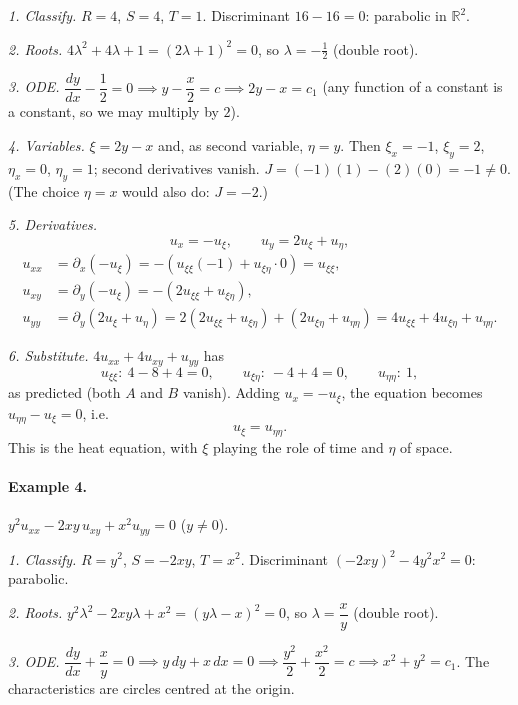 \documentclass[11pt]{article}
\theoremstyle{plain}
\theoremstyle{definition}
\theoremstyle{remark}
\begin{document}
\emph{1. Classify.} $R = 4$, $S = 4$, $T = 1$. Discriminant $16 - 16 = 0$: parabolic in $\mathbb{R}^2$.

\emph{2. Roots.} $4\lambda^2 + 4\lambda + 1 = (2\lambda + 1)^2 = 0$, so $\lambda = -\frac12$ (double root).

\emph{3. ODE.} $\dfrac{dy}{dx} - \dfrac12 = 0 \implies y - \dfrac x2 = c \implies 2y - x = c_1$ (any function of a constant is a constant, so we may multiply by $2$).

\emph{4. Variables.} $\xi = 2y - x$ and, as second variable, $\eta = y$. Then $\xi_x = -1$, $\xi_y = 2$, $\eta_x = 0$, $\eta_y = 1$; second derivatives vanish. $J = (-1)(1) - (2)(0) = -1 \neq 0$. (The choice $\eta = x$ would also do: $J = -2$.)

\emph{5. Derivatives.}
$$ u_x = -u_\xi, \qquad u_y = 2u_\xi + u_\eta, $$
\begin{align*}
u_{xx} &= \partial_x(-u_\xi) = -(u_{\xi\xi}(-1) + u_{\xi\eta}\cdot 0) = u_{\xi\xi}, \\
u_{xy} &= \partial_y(-u_\xi) = -(2u_{\xi\xi} + u_{\xi\eta}), \\
u_{yy} &= \partial_y(2u_\xi + u_\eta) = 2(2u_{\xi\xi} + u_{\xi\eta}) + (2u_{\xi\eta} + u_{\eta\eta}) = 4u_{\xi\xi} + 4u_{\xi\eta} + u_{\eta\eta}.
\end{align*}

\emph{6. Substitute.} $4u_{xx} + 4u_{xy} + u_{yy}$ has
$$ u_{\xi\xi}: \ 4 - 8 + 4 = 0, \qquad u_{\xi\eta}: \ -4 + 4 = 0, \qquad u_{\eta\eta}: \ 1, $$
as predicted (both $A$ and $B$ vanish). Adding $u_x = -u_\xi$, the equation becomes $u_{\eta\eta} - u_\xi = 0$, i.e.
$$ u_\xi = u_{\eta\eta}. $$
This is the heat equation, with $\xi$ playing the role of time and $\eta$ of space.

\paragraph{Example 4.} $y^2u_{xx} - 2xy\,u_{xy} + x^2u_{yy} = 0$ \quad ($y \ne 0$).

\emph{1. Classify.} $R = y^2$, $S = -2xy$, $T = x^2$. Discriminant $(-2xy)^2 - 4y^2x^2 = 0$: parabolic.

\emph{2. Roots.} $y^2\lambda^2 - 2xy\lambda + x^2 = (y\lambda - x)^2 = 0$, so $\lambda = \dfrac{x}{y}$ (double root).

\emph{3. ODE.} $\dfrac{dy}{dx} + \dfrac xy = 0 \implies y\,dy + x\,dx = 0 \implies \dfrac{y^2}{2} + \dfrac{x^2}{2} = c \implies x^2 + y^2 = c_1$. The characteristics are circles centred at the origin.
\end{document}
